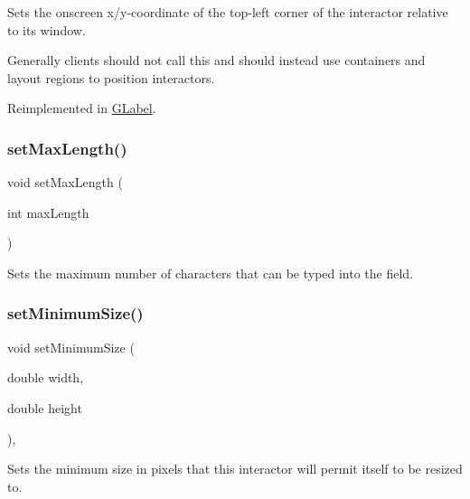 Sets the onscreen x/y-\/coordinate of the top-\/left corner of the interactor relative to its window. 

Generally clients should not call this and should instead use containers and layout regions to position interactors. 

Reimplemented in \mbox{\hyperlink{classGLabel_a40e39a7bf1b0b46b3a5710bb9a0d214b}{G\+Label}}.

\mbox{\label{classGTextField_a077c24fa5337fbf431738f8ba513d19c}} 
\subsubsection{\texorpdfstring{set\+Max\+Length()}{setMaxLength()}}
{\footnotesize\ttfamily void set\+Max\+Length (\begin{DoxyParamCaption}\item[{int}]{max\+Length }\end{DoxyParamCaption})\hspace{0.3cm}{\ttfamily [virtual]}}



Sets the maximum number of characters that can be typed into the field. 

\mbox{\label{classGInteractor_a0cf428e207b7f22cc08138a90b1b87b2}} 
\subsubsection{\texorpdfstring{set\+Minimum\+Size()}{setMinimumSize()}\hspace{0.1cm}{\footnotesize\ttfamily [1/2]}}
{\footnotesize\ttfamily void set\+Minimum\+Size (\begin{DoxyParamCaption}\item[{double}]{width,  }\item[{double}]{height }\end{DoxyParamCaption})\hspace{0.3cm}{\ttfamily [virtual]}, {\ttfamily [inherited]}}



Sets the minimum size in pixels that this interactor will permit itself to be resized to. 


